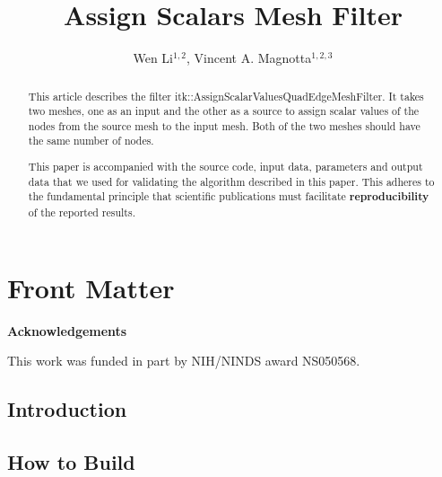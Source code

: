 \documentclass{InsightArticle}
\title{Assign Scalars Mesh Filter}
\author{Wen Li$^{1,2}$, Vincent A. Magnotta$^{1,2,3}$}
\makeatletter
\newcommand\ackname{Acknowledgements}
\newenvironment{acknowledgements}{%
      \titlepage
      \null\vfil
      \@beginparpenalty\@lowpenalty
      \begin{center}%
        \bfseries \ackname
        \@endparpenalty\@M
      \end{center}}%
     {\par\vfil\null\endtitlepage}
\newenvironment{acknowledgements}{%
      \if@twocolumn
        \section*{\abstractname}%
      \else
        \small
        \begin{center}%
          {\bfseries \ackname\vspace{-.5em}\vspace{\z@}}%
        \end{center}%
        \quotation
      \fi}
      {\if@twocolumn\else\endquotation\fi}
\newcommand{\IJhandlerIDnumber}{3117}
\makeatother
\begin{document}
%
% 
\IJhandlefooter{\IJhandlerIDnumber}


\ifpdf
\else
\fi


\maketitle


\ifhtml
\chapter*{Front Matter\label{front}}
\fi


\begin{abstract}
 
This article describes the filter itk::AssignScalarValuesQuadEdgeMeshFilter.  It
takes two meshes, one as an input and the other as a source to assign scalar
values of the nodes from the source mesh to the input mesh.  Both of the two 
meshes should have the same number of nodes.

This paper is accompanied with the source code, input data, parameters and
output data that we used for validating the algorithm described in this paper.
This adheres to the fundamental principle that scientific publications must
facilitate \textbf{reproducibility} of the reported results.
\end{abstract}

\begin{acknowledgements}
This work was funded in part by NIH/NINDS award NS050568.
\end{acknowledgements}

\tableofcontents

\section{Introduction}


\section{How to Build}
\end{document}
